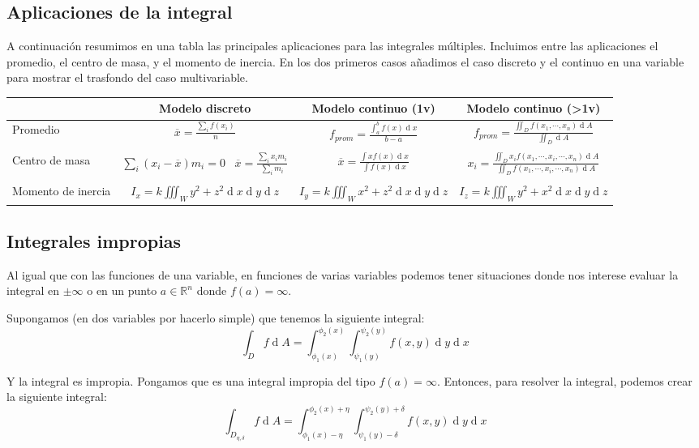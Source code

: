 \documentclass[a4paper]{article}
\renewcommand{\d}[1]{\ensuremath{\operatorname{d}\!{#1}}}
\begin{document}
\subsection{Aplicaciones de la integral}
A continuación resumimos en una tabla las principales aplicaciones para las integrales múltiples. Incluimos entre las aplicaciones el promedio, el centro de masa, y el momento de inercia. En los dos primeros casos añadimos el caso discreto y el continuo en una variable para mostrar el trasfondo del caso multivariable.

\begin{center}
\begin{tabular}{lccc} \midrule
	& Modelo discreto & Modelo continuo (1v) & Modelo continuo (>1v)\\ \midrule
	Promedio & $\overline{x} = \frac{\sum_i f(x_i)}{n}$ &
	$f_{prom} = \frac{\int_a^bf(x) \d{x}}{b-a}$ & 
	$f_{prom} = \frac{\iint_D f(x_1, \cdots, x_n) \d{A}}{\iint_D\d{A}}$ \\
	& & & \\
	\small{Centro de masa} & $\sum_i(x_i-\overline{x})m_i = 0 \;\;\; \overline{x} = \frac{\sum_ix_im_i}{\sum_im_i}$ & 
	$\overline{x} = \frac{\int x f(x) \d{x}}{\int f(x) \d{x}}$ &
	$x_i = \frac{\iint_D x_i f(x_1,\cdots,x_i,\cdots,x_n)\d{A}}{\iint_D f(x_1,\cdots,x_i,\cdots,x_n)\d{A}}$\\
	& & & \\
	\small{Momento de inercia} &
	$I_x = k \iiint_W y^2+z^2 \d{x}\d{y}\d{z}$ &  
	$I_y = k \iiint_W x^2+z^2 \d{x}\d{y}\d{z}$ & 
	$I_z = k \iiint_W y^2+x^2 \d{x}\d{y}\d{z}$ \\
	
	 \midrule
\end{tabular}
\end{center}

 \subsection{Integrales impropias}
Al igual que con las funciones de una variable, en funciones de varias variables podemos tener situaciones donde nos interese evaluar la integral en $\pm \infty$ o en un punto $a \in \mathbb{R}^n$ donde $f(a) = \infty$. 

Supongamos (en dos variables por hacerlo simple) que tenemos la siguiente integral:
\[ \int_D f \d{A} = \int_{\phi_{ 1 }(x)}^{\phi_{2}(x)}\int_{\psi_{ 1 }(y)}^{\psi_{2}(y)} f(x,y) \d{y}\d{x} \]

Y la integral es impropia. Pongamos que es una integral impropia del tipo $f(a) = \infty$. Entonces, para resolver la integral, podemos crear la siguiente integral:
\[ \int_{D_{\eta,\delta}} f \d{A} = \int_{\phi_{ 1 }(x)-\eta}^{\phi_{2}(x)+\eta}\int_{\psi_{ 1 }(y)-\delta}^{\psi_{2}(y)+\delta} f(x,y) \d{y}\d{x} \]
\end{document}
